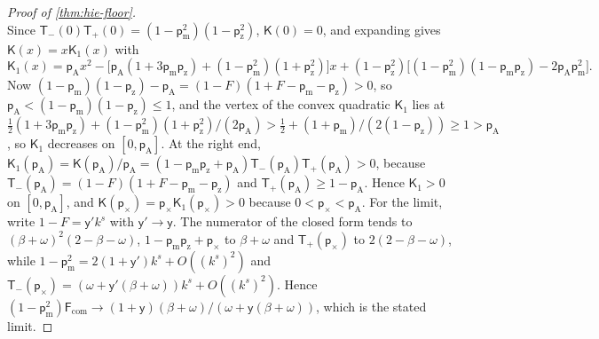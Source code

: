 \begin{proof}[Proof of \cref{thm:hie-floor}]
\[\]
Since $\mathsf T_-(0)\mathsf T_+(0)=(1-\mathsf p_{\mathrm m}^2)(1-\mathsf p_{\mathrm z}^2)$, $\mathsf K(0)=0$, and expanding gives $\mathsf K(x)=x\mathsf K_1(x)$ with
\[
\mathsf K_1(x)=\mathsf p_{\mathrm A}x^2-\bigl[\mathsf p_{\mathrm A}(1+3\mathsf p_{\mathrm m}\mathsf p_{\mathrm z})+(1-\mathsf p_{\mathrm m}^2)(1+\mathsf p_{\mathrm z}^2)\bigr]x+(1-\mathsf p_{\mathrm z}^2)\bigl[(1-\mathsf p_{\mathrm m}^2)(1-\mathsf p_{\mathrm m}\mathsf p_{\mathrm z})-2\mathsf p_{\mathrm A}\mathsf p_{\mathrm m}^2\bigr].
\]
Now $(1-\mathsf p_{\mathrm m})(1-\mathsf p_{\mathrm z})-\mathsf p_{\mathrm A}=(1-F)(1+F-\mathsf p_{\mathrm m}-\mathsf p_{\mathrm z})>0$, so $\mathsf p_{\mathrm A}<(1-\mathsf p_{\mathrm m})(1-\mathsf p_{\mathrm z})\le1$, and the vertex of the convex quadratic $\mathsf K_1$ lies at $\frac12(1+3\mathsf p_{\mathrm m}\mathsf p_{\mathrm z})+(1-\mathsf p_{\mathrm m}^2)(1+\mathsf p_{\mathrm z}^2)/(2\mathsf p_{\mathrm A})>\frac12+(1+\mathsf p_{\mathrm m})/(2(1-\mathsf p_{\mathrm z}))\ge1>\mathsf p_{\mathrm A}$, so $\mathsf K_1$ decreases on $[0,\mathsf p_{\mathrm A}]$. At the right end, $\mathsf K_1(\mathsf p_{\mathrm A})=\mathsf K(\mathsf p_{\mathrm A})/\mathsf p_{\mathrm A}=(1-\mathsf p_{\mathrm m}\mathsf p_{\mathrm z}+\mathsf p_{\mathrm A})\mathsf T_-(\mathsf p_{\mathrm A})\mathsf T_+(\mathsf p_{\mathrm A})>0$, because $\mathsf T_-(\mathsf p_{\mathrm A})=(1-F)(1+F-\mathsf p_{\mathrm m}-\mathsf p_{\mathrm z})$ and $\mathsf T_+(\mathsf p_{\mathrm A})\ge1-\mathsf p_{\mathrm A}$. Hence $\mathsf K_1>0$ on $[0,\mathsf p_{\mathrm A}]$, and $\mathsf K(\mathsf p_\times)=\mathsf p_\times\mathsf K_1(\mathsf p_\times)>0$ because $0<\mathsf p_\times<\mathsf p_{\mathrm A}$. For the limit, write $1-F=\mathsf y'k^s$ with $\mathsf y'\to\mathsf y$. The numerator of the closed form tends to $(\beta+\omega)^2(2-\beta-\omega)$, $1-\mathsf p_{\mathrm m}\mathsf p_{\mathrm z}+\mathsf p_\times$ to $\beta+\omega$ and $\mathsf T_+(\mathsf p_\times)$ to $2(2-\beta-\omega)$, while $1-\mathsf p_{\mathrm m}^2=2(1+\mathsf y')k^s+O((k^s)^2)$ and $\mathsf T_-(\mathsf p_\times)=(\omega+\mathsf y'(\beta+\omega))k^s+O((k^s)^2)$. Hence $(1-\mathsf p_{\mathrm m}^2)\mathsf F_{\mathrm{com}}\to(1+\mathsf y)(\beta+\omega)/(\omega+\mathsf y(\beta+\omega))$, which is the stated limit.
\end{proof}

